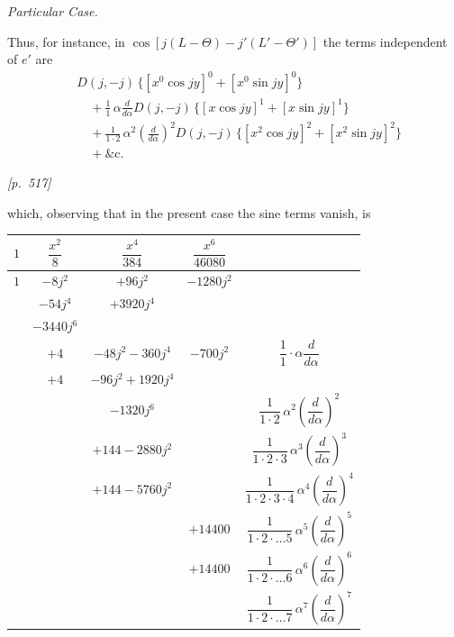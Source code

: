 \documentclass[11pt]{article}
\begin{document}
\medskip

\begin{center}
\textit{Particular Case.}
\end{center}

\medskip

Thus, for instance, in $\cos[j(L-\Theta)-j'(L'-\Theta')]$ the terms
independent of $e'$ are
\[
\begin{aligned}
&D(j,-j)\,\{[x^0\cos jy]^0+[x^0\sin jy]^0\}\\
&\quad+\tfrac{1}{1}\,\alpha\frac{d}{d\alpha}D(j,-j)\,\{[x\cos jy]^1+[x\sin jy]^1\}\\
&\quad+\tfrac{1}{1\cdot2}\,\alpha^2\left(\frac{d}{d\alpha}\right)^2 D(j,-j)\,\{[x^2\cos jy]^2+[x^2\sin jy]^2\}\\
&\quad+\&\mathrm{c}.
\end{aligned}
\]


\newpage
\noindent\textit{[p.~517]}

\medskip

which, observing that in the present case the sine terms vanish, is

\medskip

\begin{center}
\begin{tabular}{|c|c|c|c|c|}
\hline
$1$ & $\dfrac{x^2}{8}$ & $\dfrac{x^4}{384}$ & $\dfrac{x^6}{46080}$ & \\
\hline
$1$ & $-8j^2$ & $+96j^2$ & $-1280j^2$ & \\
 & $-54j^4$ & $+3920j^4$ & & \\
 & $-3440j^6$ & & & \\
\hline
 & $+4$ & $-48j^2-360j^4$ & $-700j^2$ & $\dfrac{1}{1}\cdot\alpha\dfrac{d}{d\alpha}$ \\
\hline
 & $+4$ & $-96j^2+1920j^4$ & & \\
 & & $-1320j^6$ & & $\dfrac{1}{1\cdot2}\,\alpha^2\left(\dfrac{d}{d\alpha}\right)^2$ \\
\hline
 & & $+144-2880j^2$ & & $\dfrac{1}{1\cdot2\cdot3}\,\alpha^3\left(\dfrac{d}{d\alpha}\right)^3$ \\
 & & $+144-5760j^2$ & & $\dfrac{1}{1\cdot2\cdot3\cdot4}\,\alpha^4\left(\dfrac{d}{d\alpha}\right)^4$ \\
\hline
 & & & $+14400$ & $\dfrac{1}{1\cdot2\cdot\ldots5}\,\alpha^5\left(\dfrac{d}{d\alpha}\right)^5$ \\
 & & & $+14400$ & $\dfrac{1}{1\cdot2\cdot\ldots6}\,\alpha^6\left(\dfrac{d}{d\alpha}\right)^6$ \\
 & & & & $\dfrac{1}{1\cdot2\cdot\ldots7}\,\alpha^7\left(\dfrac{d}{d\alpha}\right)^7$ \\
\hline
\end{tabular}
\end{center}
\end{document}
